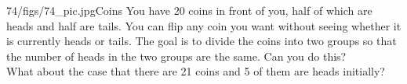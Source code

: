 \begin{problem}{74/figs/74_pic.jpg}{Coins} You have 20 coins in front of you, half of which are heads and half are tails. You can flip any coin you want without seeing whether it is currently heads or tails. The goal is to divide the coins into two groups so that the number of heads in the two groups are the same. Can you do this?\\[0.2cm]
	
What about the case that there are 21 coins and 5 of them are heads initially?
\end{problem}
